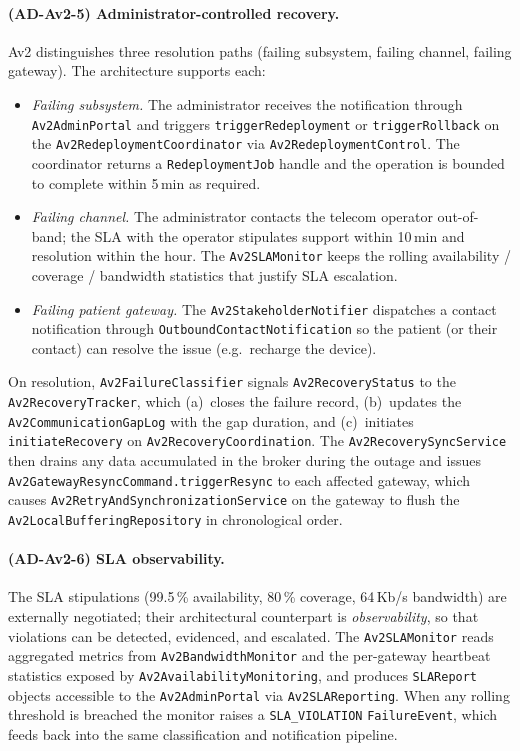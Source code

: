 \paragraph{(AD-Av2-5) Administrator-controlled recovery.}
Av2 distinguishes three resolution paths (failing subsystem, failing
channel, failing gateway). The architecture supports each:
\begin{itemize}
  \item \emph{Failing subsystem.} The administrator receives the
        notification through \texttt{Av2AdminPortal} and triggers
        \texttt{triggerRedeployment} or \texttt{triggerRollback} on the
        \texttt{Av2RedeploymentCoordinator} via
        \texttt{Av2RedeploymentControl}. The coordinator returns a
        \texttt{RedeploymentJob} handle and the operation is bounded to
        complete within 5\,min as required.
  \item \emph{Failing channel.} The administrator contacts the telecom
        operator out-of-band; the SLA with the operator stipulates support
        within 10\,min and resolution within the hour. The
        \texttt{Av2SLAMonitor} keeps the rolling availability / coverage /
        bandwidth statistics that justify SLA escalation.
  \item \emph{Failing patient gateway.} The
        \texttt{Av2StakeholderNotifier} dispatches a contact notification
        through \texttt{OutboundContactNotification} so the patient (or
        their contact) can resolve the issue (e.g.\ recharge the device).
\end{itemize}
On resolution, \texttt{Av2FailureClassifier} signals
\texttt{Av2RecoveryStatus} to the \texttt{Av2RecoveryTracker}, which
(a)~closes the failure record, (b)~updates the
\texttt{Av2CommunicationGapLog} with the gap duration, and (c)~initiates
\texttt{initiateRecovery} on \texttt{Av2RecoveryCoordination}. The
\texttt{Av2RecoverySyncService} then drains any data accumulated in the
broker during the outage and issues
\texttt{Av2GatewayResyncCommand.triggerResync} to each affected gateway,
which causes \texttt{Av2RetryAndSynchronizationService} on the gateway to
flush the \texttt{Av2LocalBufferingRepository} in chronological order.

\paragraph{(AD-Av2-6) SLA observability.}
The SLA stipulations (99.5\,\% availability, 80\,\% coverage, 64\,Kb/s
bandwidth) are externally negotiated; their architectural counterpart is
\emph{observability}, so that violations can be detected, evidenced, and
escalated. The \texttt{Av2SLAMonitor} reads aggregated metrics from
\texttt{Av2BandwidthMonitor} and the per-gateway heartbeat statistics
exposed by \texttt{Av2AvailabilityMonitoring}, and produces
\texttt{SLAReport} objects accessible to the \texttt{Av2AdminPortal} via
\texttt{Av2SLAReporting}. When any rolling threshold is breached the
monitor raises a \texttt{SLA\_VIOLATION} \texttt{FailureEvent}, which
feeds back into the same classification and notification pipeline.

